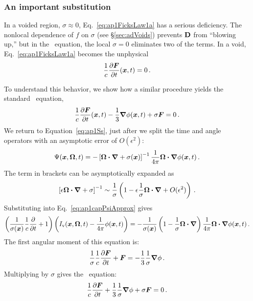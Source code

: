 \subsubsection{An important substitution}
In a voided region, $\sigma\approx 0$, Eq.~\eqref{eq:ap1FicksLaw1a}
has a serious deficiency. The nonlocal dependence of $f$ on $\sigma$ (see
\S\ref{sec:adVoids}) prevents $\mathbf{D}$ from ``blowing up,'' but in the \APone\
equation, the local $\sigma=0$ eliminates two of the terms. In a void,
Eq.~\eqref{eq:ap1FicksLaw1a} becomes the unphysical
\begin{equation*}
  \frac{1}{c}\frac{\partial \bm{F}}{\partial t}(\bm{x},t) = 0\,.
\end{equation*}

To understand this behavior, we show how a similar procedure yields the standard
\Pone\ equation,
\begin{equation*}
  \frac{1}{c}\frac{\partial \bm{F}}{\partial t}(\bm{x},t) - \frac{1}{3}\bm{\nabla} \phi(\bm{x},t)
  + \sigma \bm{F} = 0\,.
\end{equation*}
We return to Equation~\eqref{eq:ap1Ss}, just after we split the time and angle
operators with an asymptotic error of $O(\epsilon^2)$:
\begin{equation*}
  \Psi(\bm{x},\bm{\Omega},t)
  = - \left[ \bm{\Omega}\bm{\cdot} \bm{\nabla} + \sigma(\bm{x}) \right]^{-1} \frac{1}{4\pi} \bm{\Omega}\bm{\cdot} \bm{\nabla} \phi (\bm{x},t)\,.
\end{equation*}
The term in brackets can be asymptotically expanded as
\begin{equation*}
  \left[ \epsilon \bm{\Omega}\bm{\cdot} \bm{\nabla} + \sigma \right]^{-1}
  \sim \frac{1}{\sigma} \left( 1
  - \epsilon \frac{1}{\sigma} \bm{\Omega}\bm{\cdot} \bm{\nabla} + O(\epsilon^2) \right)\,.
\end{equation*}
Substituting into Eq.~\eqref{eq:ap1capPsiApprox} gives
\begin{equation*}
  \left( \frac{1}{\sigma(\bm{x})} \frac{1}{c}\frac{\partial }{\partial t} + 1 \right)
  \left( I_\mathrm{v}(\bm{x},\bm{\Omega},t) - \frac{1}{4\pi} \phi(\bm{x},t) \right)
  = - \frac{1}{\sigma(\bm{x})} \left( 1 - \frac{1}{\sigma} \bm{\Omega}\bm{\cdot}
  \bm{\nabla} \right) \frac{1}{4\pi} \bm{\Omega}\bm{\cdot} \bm{\nabla} \phi(\bm{x},t) \,.
\end{equation*}
The first angular moment of this equation is:
\begin{equation*}
  \frac{1}{\sigma} \frac{1}{c}\frac{\partial \bm{F}}{\partial t} 
  + \bm{F}
  = - \frac{1}{3}\frac{1}{\sigma} \bm{\nabla} \phi \,.
\end{equation*}
Multiplying by $\sigma$ gives the \Pone\ equation:
\begin{equation*}
  \frac{1}{c}\frac{\partial \bm{F}}{\partial t} + \frac{1}{3}\frac{1}{\sigma} \bm{\nabla} \phi
  + \sigma\bm{F}
  = 0 \,.
\end{equation*}

